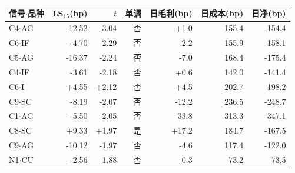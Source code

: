 \setlength{\tabcolsep}{4pt}
\begin{tabular}{lrrrrrr}
\toprule
信号$\cdot$品种 & LS$_{15}$(bp) & $t$ & 单调 & 日毛利(bp) & 日成本(bp) & 日净(bp) \\
\midrule
C4$\cdot$AG & -12.52 & -3.04 & 否 & +1.0 & 155.4 & -154.4 \\
C6$\cdot$IF & -4.70 & -2.29 & 否 & -2.2 & 155.9 & -158.1 \\
C5$\cdot$AG & -16.37 & -2.24 & 否 & -7.0 & 168.4 & -175.4 \\
C4$\cdot$IF & -3.61 & -2.18 & 否 & +0.6 & 142.0 & -141.4 \\
C6$\cdot$I & +4.55 & +2.12 & 否 & +4.5 & 202.7 & -198.2 \\
C9$\cdot$SC & -8.19 & -2.07 & 否 & -12.2 & 236.5 & -248.7 \\
C1$\cdot$AG & -5.50 & -2.05 & 否 & -33.8 & 313.3 & -347.1 \\
C8$\cdot$SC & +9.33 & +1.97 & 是 & +17.2 & 184.7 & -167.5 \\
C9$\cdot$AG & -10.12 & -1.97 & 否 & -4.6 & 117.4 & -122.0 \\
N1$\cdot$CU & -2.56 & -1.88 & 否 & -0.3 & 73.2 & -73.5 \\
\bottomrule
\end{tabular}
